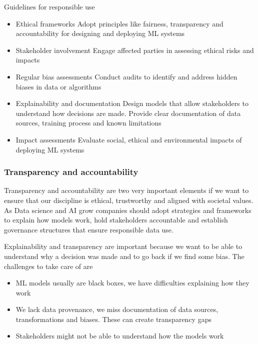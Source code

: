 Guidelines for responsible use
\begin{itemize}
    \item Ethical frameworks \ra Adopt principles like fairness, transparency and accountability for designing and deploying ML systems
    \item Stakeholder involvement \ra Engage affected parties in assessing ethical risks and impacts
    \item Regular bias assessments \ra Conduct audits to identify and address hidden biases in data or algorithms
    \item Explainability and documentation \ra Design models that allow stakeholders to understand how decisions are made. Provide clear documentation of data sources, training process and known limitations
    \item Impact assessments \ra Evaluate social, ethical and environmental impacts of deploying ML systems
\end{itemize}




























\subsubsection{Transparency and accountability}


Transparency and accountability are two very important elements if we want to ensure that our discipline is ethical, trustworthy and aligned with societal values. As Data science and AI grow companies should adopt strategies and frameworks to explain how models work, hold stakeholders accountable and establish governance structures that ensure responsible data use.

\vspace{10pt}

Explainability and transparency are important because we want to be able to understand why a decision was made and to go back if we find some bias. The challenges to take care of are

\begin{itemize}
    \item ML models usually are black boxes, we have difficulties explaining how they work
    \item We lack data provenance, we miss documentation of data sources, transformations and biases. These can create transparency gaps
    \item Stakeholders might not be able to understand how the models work
\end{itemize}

